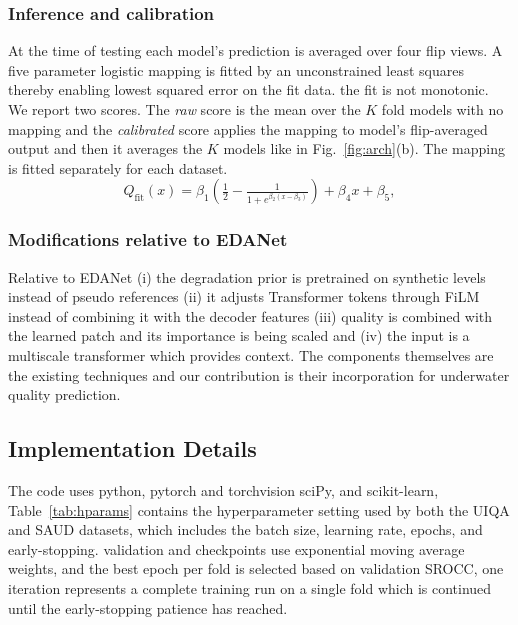 \documentclass[conference]{IEEEtran}
\begin{document}
\subsubsection{Inference and calibration}
At the time of testing each model's prediction is averaged over four flip views. A five parameter logistic mapping
is fitted by an unconstrained least squares thereby enabling lowest squared error on the fit data. the fit is not monotonic. We report two scores. The \emph{raw} score is the mean over the $K$ fold models  with no mapping and the \emph{calibrated} score applies the mapping to  model's flip-averaged output and then it averages the $K$ models like in Fig.~\ref{fig:arch}(b). The mapping is fitted separately for each dataset.
\begin{equation}
Q_{\text{fit}}(x)=\beta_1\!\left(\tfrac12-\tfrac{1}{1+e^{\beta_2(x-\beta_3)}}\right)+\beta_4x+\beta_5,
\end{equation}
\vspace{0.2cm}
\subsubsection{Modifications relative to EDANet}
Relative to EDANet (i) the degradation prior is pretrained on synthetic levels instead of pseudo references (ii) it adjusts Transformer tokens through FiLM instead of combining it with the decoder features (iii) quality is combined with the learned patch and its importance is being scaled and (iv) the input is a multiscale transformer which provides context. The components themselves are the existing techniques and our contribution is their incorporation for underwater quality prediction.

\subsection{Implementation Details}

The code uses python, pytorch and torchvision sciPy, and scikit-learn, Table~\ref{tab:hparams} contains the hyperparameter
setting used by both the UIQA and SAUD datasets, which includes the batch size, learning rate, epochs,
and early-stopping. validation and checkpoints use exponential moving average weights, and the best
epoch per fold is selected based on validation SROCC, one iteration represents a complete training run on
a single fold which is continued until the early-stopping patience has reached.
\end{document}
